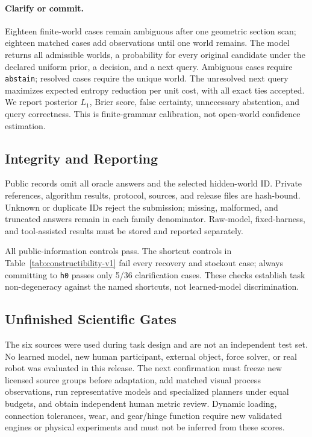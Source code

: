 \paragraph{Clarify or commit.}
Eighteen finite-world cases remain ambiguous after one geometric section
scan; eighteen matched cases add observations until one world remains.
The model returns all admissible worlds, a probability for every original
candidate under the declared uniform prior, a decision, and a next query.
Ambiguous cases require \texttt{abstain}; resolved cases require the unique
world. The unresolved next query maximizes expected entropy reduction per
unit cost, with all exact ties accepted. We report posterior $L_1$, Brier
score, false certainty, unnecessary abstention, and query correctness.
This is finite-grammar calibration, not open-world confidence estimation.

\subsection{Integrity and Reporting}
Public records omit all oracle answers and the selected hidden-world ID.
Private references, algorithm results, protocol, sources, and release files
are hash-bound. Unknown or duplicate IDs reject the submission; missing,
malformed, and truncated answers remain in each family denominator.
Raw-model, fixed-harness, and tool-assisted results must be stored and
reported separately.

All public-information controls pass. The shortcut controls in
Table~\ref{tab:constructibility-v1} fail every recovery and stockout case;
always committing to \texttt{h0} passes only 5/36 clarification cases.
These checks establish task non-degeneracy against the named shortcuts, not
learned-model discrimination.

\subsection{Unfinished Scientific Gates}
The six sources were used during task design and are not an independent test
set. No learned model, new human participant, external object, force solver,
or real robot was evaluated in this release. The next confirmation must freeze
new licensed source groups before adaptation, add matched visual process
observations, run representative models and specialized planners under equal
budgets, and obtain independent human metric review. Dynamic loading,
connection tolerances, wear, and gear/hinge function require new validated
engines or physical experiments and must not be inferred from these scores.
